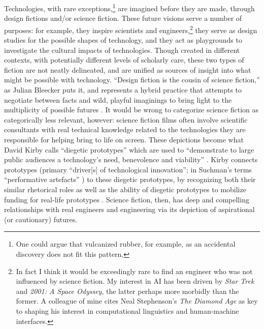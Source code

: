 Technologies, with rare exceptions,\footnote{One could argue that
  vulcanized rubber, for example, as an accidental discovery does not
  fit this pattern.} are imagined before they are made, through design
fictions and/or science fiction. These future
visions serve a number of purposes: for example, they inspire scientists and
engineers,\footnote{In fact I think it would be exceedingly rare to
  find an engineer who was not influenced by science fiction. My
  interest in AI has been driven by \emph{Star Trek} and \emph{2001: A
  Space Odyssey}, the latter perhaps more morbidly than the former. A
  colleague of mine cites Neal Stephenson's
  \emph{The Diamond Age} as key to shaping his interest in
  computational linguistics and human-machine interfaces.} they serve as design
studies for the possible shapes of technology, and they act as
playgrounds to investigate the cultural impacts of technologies.
Though created in different contexts, with potentially 
different levels of scholarly care, these two types of fiction are not
neatly delineated, and are unified as sources of insight into what
might be possible with technology. ``Design fiction is the cousin of
science fiction,'' as Julian Bleecker puts it, and represents a hybrid
practice that attempts to negotiate between facts and wild, playful
imaginings to bring light to the multiplicity of possible
futures \cite[p. 8]{bleecker}. It would be wrong to categorize science
fiction as categorically less relevant, however: science fiction
films
often involve scientific consultants with real
technical knowledge related to the technologies they are responsible for
helping bring to life on screen. These depictions become what David
Kirby calls ``diegetic prototypes'' which are used to ``demonstrate to
large public audiences a technology's need, benevolence and
viability'' \cite[p. 43]{kirbyFuture}. Kirby connects prototypes (primary
``driver[s] of technological innovation''; in
Suchman's terms ``performative artefacts'' \cite[p. 45]{kirbyFuture})
to these diegetic prototypes, 
by recognizing both their similar rhetorical roles as well as the
ability of diegetic prototypes to mobilize funding for real-life
prototypes \cite[p. 44-47]{kirbyFuture}. Science fiction, then, has deep
and compelling relationships with real engineers and engineering via
its depiction of aspirational (or cautionary) futures.


